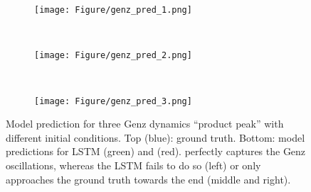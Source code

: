 %

\begin{figure}[ht]
        \vskip 0.2in
    \begin{center}
    \begin{subfigure}[b]{0.31\textwidth}
        \texttt{[image: Figure/genz\_pred\_1.png]}
        \label{fig:f2}
    \end{subfigure}
    ~ %
    \begin{subfigure}[b]{0.31\textwidth}
        \texttt{[image: Figure/genz\_pred\_2.png]}
        \label{fig:df2}
    \end{subfigure}
    ~ %
    \begin{subfigure}[b]{0.31\textwidth}
        \texttt{[image: Figure/genz\_pred\_3.png]}
        \label{fig:df2}
    \end{subfigure}
    \caption{Model prediction for three Genz dynamics ``product peak'' with different initial conditions. Top (blue): ground truth. Bottom: model predictions for LSTM (green) and \tlstm{} (red). \tlstm{} perfectly captures the Genz oscillations, whereas the LSTM fails to do so (left) or only approaches the ground truth towards the end (middle and right).}
        \label{fig:genz_pred}
\end{center}
        \vskip -0.2in
\end{figure}

